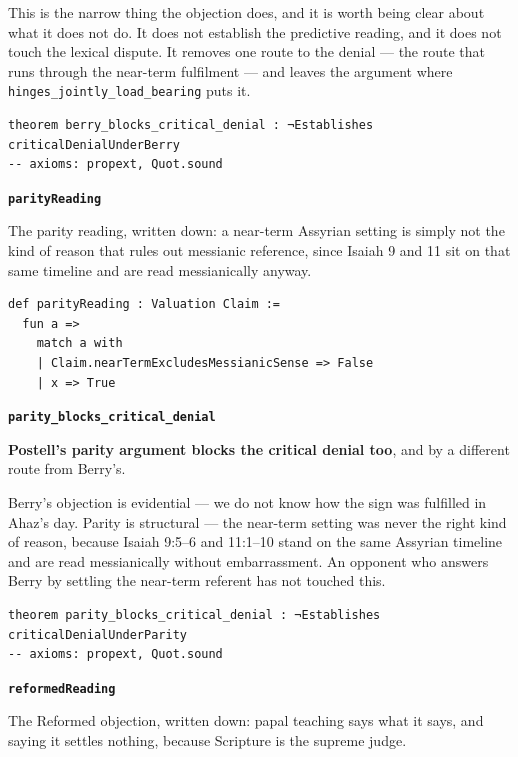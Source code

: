 \documentclass[11pt]{article}
\begin{document}
This is the narrow thing the objection does, and it is worth being clear about what it does not do. It does not establish the predictive reading, and it does not touch the lexical dispute. It removes one route to the denial — the route that runs through the near-term fulfilment — and leaves the argument where \texttt{hinges\_\allowbreak{}jointly\_\allowbreak{}load\_\allowbreak{}bearing} puts it.

{\small\begin{verbatim}
theorem berry_blocks_critical_denial : ¬Establishes criticalDenialUnderBerry
-- axioms: propext, Quot.sound
\end{verbatim}}
\par\medskip\noindent\textbf{\texttt{parity\allowbreak{}Reading}}\par\nobreak\noindent
The parity reading, written down: a near-term Assyrian setting is simply not the kind of reason that rules out messianic reference, since Isaiah 9 and 11 sit on that same timeline and are read messianically anyway.

{\small\begin{verbatim}
def parityReading : Valuation Claim :=
  fun a =>
    match a with
    | Claim.nearTermExcludesMessianicSense => False
    | x => True
\end{verbatim}}
\par\medskip\noindent\textbf{\texttt{parity\_\allowbreak{}blocks\_\allowbreak{}critical\_\allowbreak{}denial}}\par\nobreak\noindent
\textbf{Postell’s parity argument blocks the critical denial too}, and by a different route from Berry’s.

Berry’s objection is evidential — we do not know how the sign was fulfilled in Ahaz’s day. Parity is structural — the near-term setting was never the right kind of reason, because Isaiah 9:5–6 and 11:1–10 stand on the same Assyrian timeline and are read messianically without embarrassment. An opponent who answers Berry by settling the near-term referent has not touched this.

{\small\begin{verbatim}
theorem parity_blocks_critical_denial : ¬Establishes criticalDenialUnderParity
-- axioms: propext, Quot.sound
\end{verbatim}}
\par\medskip\noindent\textbf{\texttt{reformed\allowbreak{}Reading}}\par\nobreak\noindent
The Reformed objection, written down: papal teaching says what it says, and saying it settles nothing, because Scripture is the supreme judge.
\end{document}
